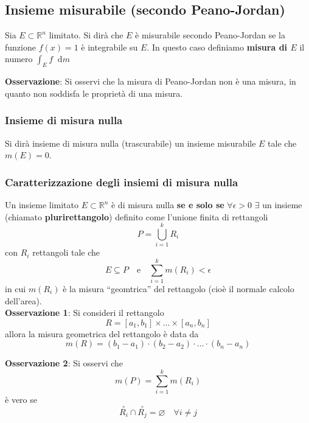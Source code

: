 \documentclass[a4paper]{extarticle}
\newcommand{\quotes}[1]{``#1''}
\newcommand*\dif{\mathop{}\!\mathrm{d}}
\begin{document}
\vspace{1em}
\subsection{Insieme misurabile (secondo Peano-Jordan)}
Sia $E \subset \mathbb{R}^n$ limitato. Si dirà che $E$ è misurabile secondo Peano-Jordan se la funzione $f(x)=1$ è integrabile su $E$. In questo caso definiamo \textbf{misura di $E$} il numero $\displaystyle{\int_E f \dif m}$

\vspace{1em}
\noindent
\textbf{Osservazione}: Si osservi che la misura di Peano-Jordan non è una misura, in quanto non soddisfa le proprietà di una misura.

\vspace{1em}
\subsubsection{Insieme di misura nulla}
Si dirà insieme di misura nulla (trascurabile) un insieme misurabile $E$ tale che $m(E)=0$.

\vspace{1em}
\subsubsection{Caratterizzazione degli insiemi di misura nulla}
Un insieme limitato $E \subset \mathbb{R}^n$ è di misura nulla \textbf{se e solo se} $\forall \epsilon > 0$ $\exists$ un insieme (chiamato \textbf{plurirettangolo}) definito come l'unione finita di rettangoli
\[P=\bigcup_{i=1}^k R_i\]
con $R_i$ rettangoli tale che
\[E \subseteq P \hspace{1em} \text{e} \hspace{1em} \sum_{i=1}^k m(R_i) < \epsilon\]
in cui $m(R_i)$ è la misura \quotes{geomtrica} del rettangolo (cioè il normale calcolo dell'area).\\

\vspace{1em}
\noindent
\textbf{Osservazione 1}: Si consideri il rettangolo
\[R = [a_1,b_1] \times \dots \times [a_n,b_n]\]
allora la misura geometrica del rettangolo è data da
\[m(R) = (b_1-a_1) \cdot (b_2 - a_2) \cdot \dots \cdot (b_n-a_n)\]

\vspace{1em}
\noindent
\textbf{Osservazione 2}: Si osservi che
\[m(P) = \sum_{i=1}^k m(R_i)\]
è vero se 
\[\overset{\circ}{R_i} \cap \overset{\circ}{ R_j} = \varnothing \hspace{1em} \forall i \neq j\]
\end{document}
